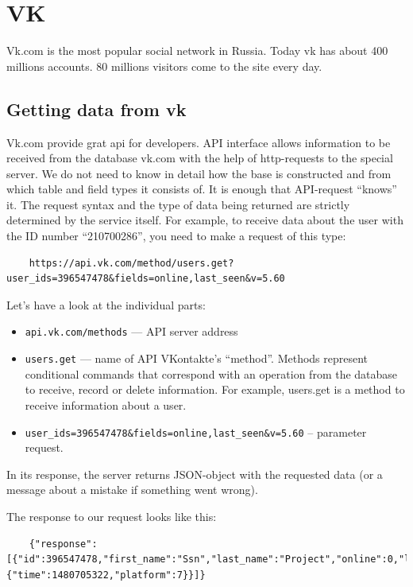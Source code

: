 \section{VK}
Vk.com is the most popular social network in Russia. Today vk has about 400 millions accounts. 80 millions visitors come to the site every day. 
\subsection{Getting data from vk}
Vk.com provide grat api for developers. API interface allows information to be received from the database vk.com with the help of http-requests to the special server. We do not need to know in detail how the base is constructed and from which table and field types it consists of. It is enough that API-request “knows” it. The request syntax and the type of data being returned are strictly determined by the service itself. 
For example, to receive data about the user with the ID number “210700286”, you need to make a request of this type:


\begin{lstlisting}
	https://api.vk.com/method/users.get?user_ids=396547478&fields=online,last_seen&v=5.60
\end{lstlisting}

Let’s have a look at the individual parts:
\begin{itemize}
	\item{\texttt{api.vk.com/methods} — API server address}
	\item{\texttt{users.get} — name of API VKontakte’s “method”. Methods represent conditional commands that correspond with an operation from the database to receive, record or delete information. For example, users.get is a method to receive information about a user.}
	\item{\texttt{user{\_}ids=396547478{\&}fields=online,last{\_}seen{\&}v=5.60}  – parameter request.}
\end{itemize}
	
In its response, the server returns JSON-object with the requested data (or a message about a mistake if something went wrong). 

The response to our request looks like this:
\begin{lstlisting}
	{"response":[{"id":396547478,"first_name":"Ssn","last_name":"Project","online":0,"last_seen":{"time":1480705322,"platform":7}}]}
\end{lstlisting}

